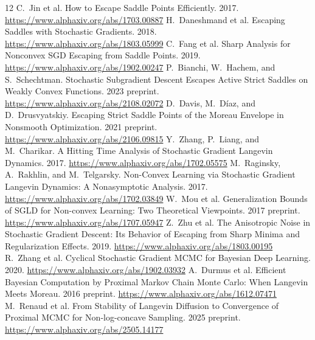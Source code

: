 \documentclass[11pt]{article}
\begin{document}
\begin{thebibliography}{12}
C.~Jin et al. How to Escape Saddle Points Efficiently. 2017.
\url{https://www.alphaxiv.org/abs/1703.00887}
H.~Daneshmand et al. Escaping Saddles with Stochastic Gradients. 2018.
\url{https://www.alphaxiv.org/abs/1803.05999}
C.~Fang et al. Sharp Analysis for Nonconvex SGD Escaping from Saddle Points.
2019. \url{https://www.alphaxiv.org/abs/1902.00247}
P.~Bianchi, W.~Hachem, and S.~Schechtman. Stochastic Subgradient Descent
Escapes Active Strict Saddles on Weakly Convex Functions. 2023 preprint.
\url{https://www.alphaxiv.org/abs/2108.02072}
D.~Davis, M.~D\'iaz, and D.~Drusvyatskiy. Escaping Strict Saddle Points of
the Moreau Envelope in Nonsmooth Optimization. 2021 preprint.
\url{https://www.alphaxiv.org/abs/2106.09815}
Y.~Zhang, P.~Liang, and M.~Charikar. A Hitting Time Analysis of Stochastic
Gradient Langevin Dynamics. 2017. \url{https://www.alphaxiv.org/abs/1702.05575}
M.~Raginsky, A.~Rakhlin, and M.~Telgarsky. Non-Convex Learning via
Stochastic Gradient Langevin Dynamics: A Nonasymptotic Analysis. 2017.
\url{https://www.alphaxiv.org/abs/1702.03849}
W.~Mou et al. Generalization Bounds of SGLD for Non-convex Learning:
Two Theoretical Viewpoints. 2017 preprint.
\url{https://www.alphaxiv.org/abs/1707.05947}
Z.~Zhu et al. The Anisotropic Noise in Stochastic Gradient Descent:
Its Behavior of Escaping from Sharp Minima and Regularization Effects. 2019.
\url{https://www.alphaxiv.org/abs/1803.00195}
R.~Zhang et al. Cyclical Stochastic Gradient MCMC for Bayesian Deep
Learning. 2020. \url{https://www.alphaxiv.org/abs/1902.03932}
A.~Durmus et al. Efficient Bayesian Computation by Proximal Markov Chain
Monte Carlo: When Langevin Meets Moreau. 2016 preprint.
\url{https://www.alphaxiv.org/abs/1612.07471}
M.~Renaud et al. From Stability of Langevin Diffusion to Convergence of
Proximal MCMC for Non-log-concave Sampling. 2025 preprint.
\url{https://www.alphaxiv.org/abs/2505.14177}
\end{thebibliography}
\end{document}
